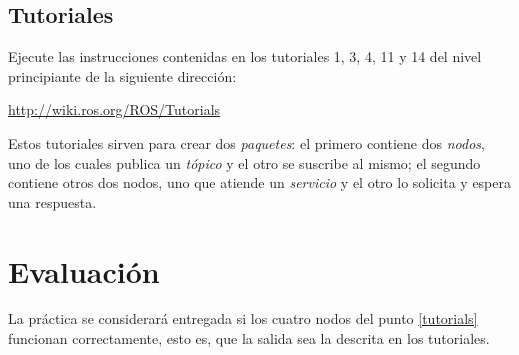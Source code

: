\documentclass[letterpaper,12pt]{article}
\begin{document}
\subsection{Tutoriales\label{tutorials}}

Ejecute las instrucciones contenidas en los tutoriales 1, 3, 4, 11 y 14 del nivel principiante de la siguiente dirección:

\url{http://wiki.ros.org/ROS/Tutorials}

Estos tutoriales sirven para crear dos \textit{paquetes}: el primero contiene dos \textit{nodos}, uno de los cuales publica un \textit{tópico} y el otro se suscribe al mismo; el segundo contiene otros dos nodos, uno que atiende un \textit{servicio} y el otro lo solicita y espera una respuesta. 

\section{Evaluación}

La práctica se considerará entregada si los cuatro nodos del punto \ref{tutorials} funcionan correctamente, esto es, que la salida sea la descrita en los tutoriales. 
\end{document}
